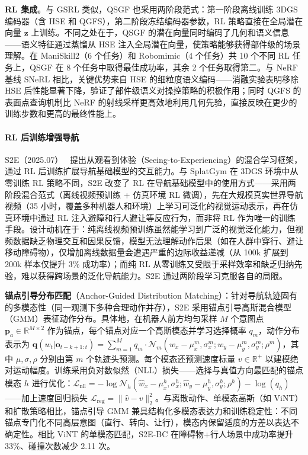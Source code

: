 \textbf{RL 集成}。与 GSRL 类似，QSGF 也采用两阶段范式：第一阶段离线训练 3DGS 编码器（含 HSE 和 QGFS），第二阶段冻结编码器参数，RL 策略直接在全局潜在向量 $\mathbf{z}$ 上训练。不同之处在于，QSGF 的潜在向量同时编码了几何和语义信息——语义特征通过蒸馏从 HSE 注入全局潜在向量，使策略能够获得部件级的场景理解。在 ManiSkill2（6 个任务）和 Robomimic（4 个任务）共 10 个不同 RL 任务上，QSGF 在 8 个任务中取得最佳成功率，其余 2 个任务取得第二。与 NeRF 基线 SNeRL 相比，关键优势来自 HSE 的细粒度语义编码——消融实验表明移除 HSE 后性能显著下降，验证了部件级语义对操控策略的积极作用；同时 QGFS 的表面点查询机制比 NeRF 的射线采样更高效地利用几何先验，直接反映在更少的训练步数和更高的最终性能上。

\paragraph{RL 后训练增强导航}

S2E（2025.07）~\cite{2507_22028} 提出从观看到体验（Seeing-to-Experiencing）的混合学习框架，通过 RL 后训练扩展导航基础模型的交互能力。与 SplatGym 在 3DGS 环境中从零训练 RL 策略不同，S2E 改变了 RL 在导航基础模型中的使用方式——采用两阶段混合范式（离线视频预训练 + 仿真环境 RL 微调），先在大规模真实世界导航视频（35 小时，覆盖多种机器人和环境）上学习可泛化的视觉运动表示，再在仿真环境中通过 RL 注入避障和行人避让等反应行为，而非将 RL 作为唯一的训练手段。设计动机在于：纯离线视频预训练虽然能学习到广泛的视觉泛化能力，但视频数据缺乏物理交互和因果反馈，模型无法理解动作后果（如在人群中穿行、避让移动障碍物），仅增加离线数据量会遭遇严重的边际收益递减（从 100k 扩展到 200k 样本仅提升 3\% 成功率）；而纯 RL 从零训练又受限于采样效率和缺乏归纳先验，难以获得跨场景的泛化导航能力。S2E 通过两阶段学习克服各自的局限。

\textbf{锚点引导分布匹配}（Anchor-Guided Distribution Matching）：针对导航轨迹固有的多模态性（同一观测下多种合理动作并存），S2E 采用锚点引导高斯混合模型（GMM）表征动作分布。具体地，在机器人前方均匀采样 $M$ 个意图点 $\bm{p}_a \in \mathbb{R}^{M \times 2}$ 作为锚点，每个锚点对应一个高斯模态并学习选择概率 $q_m$，动作分布表示为 $\bm{q}(w_t | \bm{o}_{t-k+1:t}) = \sum_{m=1}^{M} q_m \cdot \mathcal{N}_m(w_x - \mu_x^m, \sigma_x^m; w_y - \mu_y^m, \sigma_y^m; \rho^m)$，其中 $\mu, \sigma, \rho$ 分别由第 $m$ 个轨迹头预测。每个模态还预测速度标量 $v \in \mathbb{R}^+$ 以建模绝对运动幅度。训练采用负对数似然（NLL）损失——选择与真值方向最匹配的锚点模态 $h$ 进行优化：$\mathcal{L}_\text{nll} = -\log \mathcal{N}_h(\hat{w}_x - \mu_x^h, \sigma_x^h; \hat{w}_y - \mu_y^h, \sigma_y^h; \rho^h) - \log(q_h)$——加上速度回归损失 $\mathcal{L}_\text{reg} = \|\hat{v} - v\|_2^2$。与离散动作、单模态高斯（如 ViNT）和扩散策略相比，锚点引导 GMM 兼具结构化多模态表达力和训练稳定性：不同锚点专门化不同高层意图（直行、转向、让行），模态内保留适度的方差以表达不确定性。相比 ViNT 的单模态匹配，S2E-BC 在障碍物+行人场景中成功率提升 33\%、碰撞次数减少 2.11 次。

